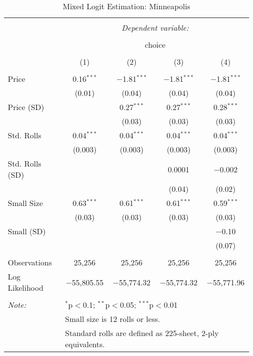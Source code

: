 
\begin{table}[!htbp] \centering 
  \caption{Mixed Logit Estimation: Minneapolis} 
  \label{tab:mnlMinneapolisRandCoefNoObsHet} 
\begin{tabular}{@{\extracolsep{5pt}}lcccc} 
\\[-1.8ex]\hline 
\hline \\[-1.8ex] 
 & \multicolumn{4}{c}{\textit{Dependent variable:}} \\ 
\cline{2-5} 
\\[-1.8ex] & \multicolumn{4}{c}{choice} \\ 
\\[-1.8ex] & (1) & (2) & (3) & (4)\\ 
\hline \\[-1.8ex] 
 Price & 0.16$^{***}$ & $-$1.81$^{***}$ & $-$1.81$^{***}$ & $-$1.81$^{***}$ \\ 
  & (0.01) & (0.04) & (0.04) & (0.04) \\ 
  Price (SD) &  & 0.27$^{***}$ & 0.27$^{***}$ & 0.28$^{***}$ \\ 
  &  & (0.03) & (0.03) & (0.03) \\ 
  Std. Rolls & 0.04$^{***}$ & 0.04$^{***}$ & 0.04$^{***}$ & 0.04$^{***}$ \\ 
  & (0.003) & (0.003) & (0.003) & (0.003) \\ 
  Std. Rolls (SD) &  &  & 0.0001 & $-$0.002 \\ 
  &  &  & (0.04) & (0.02) \\ 
  Small Size & 0.63$^{***}$ & 0.61$^{***}$ & 0.61$^{***}$ & 0.59$^{***}$ \\ 
  & (0.03) & (0.03) & (0.03) & (0.03) \\ 
  Small (SD) &  &  &  & $-$0.10 \\ 
  &  &  &  & (0.07) \\ 
 \hline \\[-1.8ex] 
Observations & 25,256 & 25,256 & 25,256 & 25,256 \\ 
Log Likelihood & $-$55,805.55 & $-$55,774.32 & $-$55,774.32 & $-$55,771.96 \\ 
\hline 
\hline \\[-1.8ex] 
\textit{Note:}  & \multicolumn{4}{l}{$^{*}$p$<$0.1; $^{**}$p$<$0.05; $^{***}$p$<$0.01} \\ 
 & \multicolumn{4}{l}{Small size is 12 rolls or less.} \\ 
 & \multicolumn{4}{l}{Standard rolls are defined as 225-sheet, 2-ply equivalents.} \\ 
\end{tabular} 
\end{table} 
